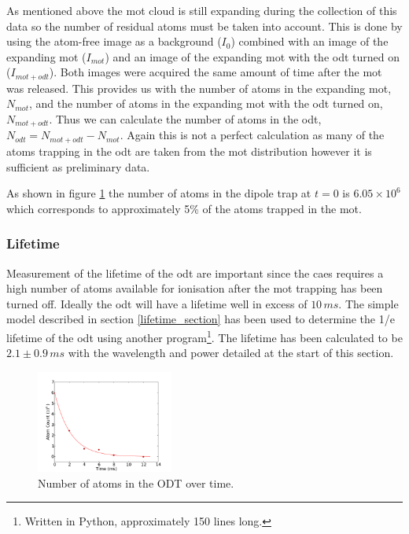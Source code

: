 As mentioned above the \gls{mot} cloud is still expanding during the collection of this data so the number of residual atoms must be taken into account. This is done by using the atom-free image as a background ($I_0$) combined with an image of the expanding \gls{mot} ($I_{mot}$) and an image of the expanding \gls{mot} with the \gls{odt} turned on ($I_{mot+odt}$). Both images were acquired the same amount of time after the \gls{mot} was released. This provides us with the number of atoms in the expanding \gls{mot}, $N_{mot}$, and the number of atoms in the expanding \gls{mot} with the \gls{odt} turned on, $N_{mot+odt}$. Thus we can calculate the number of atoms in the \gls{odt}, $N_{odt}=N_{mot+odt}-N_{mot}$. Again this is not a perfect calculation as many of the atoms trapping in the \gls{odt} are taken from the \gls{mot} distribution however it is sufficient as preliminary data.

As shown in figure \ref{fig:lifetime} the number of atoms in the dipole trap at $t=0$ is $6.05\times10^6$ which corresponds to approximately 5\% of the atoms trapped in the \gls{mot}.

\subsubsection{Lifetime}
Measurement of the lifetime of the \gls{odt} are important since the \gls{caes} requires a high number of atoms available for ionisation after the \gls{mot} trapping has been turned off. Ideally the \gls{odt} will have a lifetime well in excess of $10\,\unit{ms}$. The simple model described in section \ref{lifetime_section} has been used to determine the 1/e lifetime of the \gls{odt} using another program\footnote{Written in Python, approximately 150 lines long.}. The lifetime has been calculated to be $2.1\pm0.9\,\unit{ms}$ with the wavelength and power detailed at the start of this section.

\begin{figure}[h]
\centering
\includegraphics[width=0.4\textwidth]{figs/lifetime.pdf}
\caption{Number of atoms in the ODT over time.}
\label{fig:lifetime}
\end{figure}
